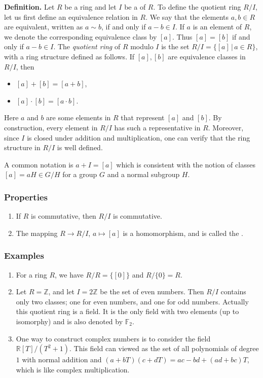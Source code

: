 \documentclass{article}
\begin{document}
{\bf Definition. }
Let $R$ be a ring and let $I$ be a  of $R$.
To define the quotient ring $R/I$, let us first
define an equivalence relation in $R$. We say that the elements $a,b\in R$
are equivalent, written as $a\sim b$, if and only if $a-b\in I$.
If $a$ is an element of $R$, we denote the corresponding equivalence
class by $[a]$. Thus $[a]=[b]$ if and only if $a-b\in I$.
The {\em quotient ring} of $R$ modulo $I$ is the set
$R/I=\{[a]\, |\, a\in R\}$, with a ring structure defined as follows.
If $[a],[b]$ are equivalence classes in $R/I$, then
 \begin{itemize}
 \item $[a]+[b] = [a+b]$,
 \item $[a]\cdot [b]=[a\cdot b]$.
 \end{itemize}
Here $a$ and $b$ are some elements in $R$ that represent $[a]$ and $[b]$.
By construction, every element in $R/I$ has such a representative in $R$.
Moreover, since $I$ is closed under addition and multiplication, one can
 verify that the ring structure in $R/I$ is well defined.

A common notation is $a+I=[a]$ which is consistent with the notion of classes $[a]=aH\in G/H$ for a group $G$ and a normal subgroup $H$.

\subsubsection*{Properties}
\begin{enumerate}
\item If $R$ is commutative, then $R/I$ is commutative.
\item The mapping $R\to R/I$, $a\mapsto [a]$ is a homomorphism, and 
is called the . 
\end{enumerate}

\subsubsection*{Examples}
\begin{enumerate}
\item For a ring $R$, we have $R/R=\{[0]\}$ and $R/\{0\}=R$.
\item Let $R=\mathbb{Z}$, and let $I=2\mathbb{Z}$ be the set of even numbers.
Then $R/I$ contains only two classes; one for  even numbers,
and one for odd numbers. Actually this quotient ring is a field. It is the only field with two elements (up to isomorphy) and is also denoted by $\mathbb{F}_2$.
\item One way to construct complex numbers is to consider the field $\mathbb{R}[T]/(T^2+1)$. This field can viewed as the set of all polynomials of degree $1$ with normal addition and $(a+bT)(c+dT)=ac-bd+(ad+bc)T$, which is like complex multiplication.
\end{enumerate}
\end{document}

